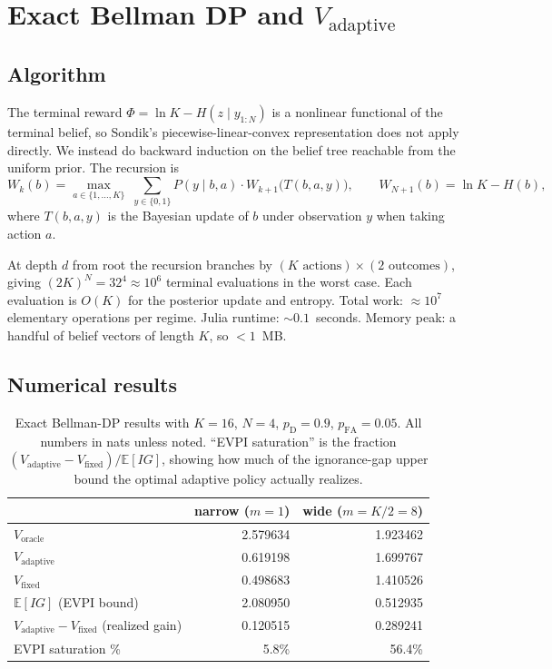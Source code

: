 \documentclass[11pt,a4paper]{article}
\newcommand{\E}{\mathbb{E}}
\begin{document}
\section{Exact Bellman DP and \texorpdfstring{$V_{\text{adaptive}}$}{V\_adaptive}}
\label{sec:dp}

\subsection{Algorithm}

The terminal reward $\Phi = \ln K - H(z \mid y_{1:N})$ is a nonlinear functional of the terminal belief, so Sondik's piecewise-linear-convex representation does not apply directly.  We instead do backward induction on the belief tree reachable from the uniform prior.  The recursion is
\begin{equation}
  W_k(b) = \max_{a \in \{1, \ldots, K\}} \; \sum_{y \in \{0, 1\}} P(y \mid b, a) \cdot W_{k+1}\!\bigl(T(b, a, y)\bigr), \qquad W_{N+1}(b) = \ln K - H(b),
  \label{eq:bellman_dp}
\end{equation}
where $T(b, a, y)$ is the Bayesian update of $b$ under observation $y$ when taking action $a$.

At depth $d$ from root the recursion branches by $(K \text{ actions}) \times (2 \text{ outcomes})$, giving $(2K)^N = 32^4 \approx 10^6$ terminal evaluations in the worst case.  Each evaluation is $O(K)$ for the posterior update and entropy.  Total work: $\approx 10^7$ elementary operations per regime.  Julia runtime: $\sim 0.1$~seconds.  Memory peak: a handful of belief vectors of length $K$, so $< 1$~MB.

\subsection{Numerical results}

\begin{table}[h!]
\centering
\begin{tabular}{@{}lrr@{}}
\toprule
& narrow ($m{=}1$) & wide ($m{=}K/2{=}8$) \\
\midrule
$V_{\text{oracle}}$        & 2.579634 & 1.923462 \\
$V_{\text{adaptive}}$      & 0.619198 & 1.699767 \\
$V_{\text{fixed}}$         & 0.498683 & 1.410526 \\
$\E[IG]$ (EVPI bound)      & 2.080950 & 0.512935 \\
$V_{\text{adaptive}} - V_{\text{fixed}}$ (realized gain) & 0.120515 & 0.289241 \\
EVPI saturation \%         & 5.8\%    & 56.4\%   \\
\bottomrule
\end{tabular}
\caption{Exact Bellman-DP results with $K = 16$, $N = 4$, $p_{\mathrm{D}} = 0.9$, $p_{\mathrm{FA}} = 0.05$.  All numbers in nats unless noted.  ``EVPI saturation'' is the fraction $(V_{\text{adaptive}} - V_{\text{fixed}}) / \E[IG]$, showing how much of the ignorance-gap upper bound the optimal adaptive policy actually realizes.}
\label{tab:dp_results}
\end{table}
\end{document}
